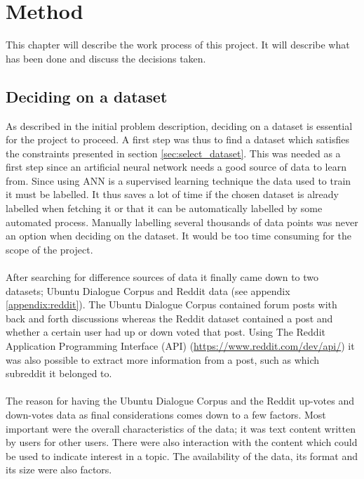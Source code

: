 \chapter{Method}\label{chap:method}
This chapter will describe the work process of this project. It will describe what has been done and discuss the decisions taken.

\section{Deciding on a dataset}\label{sec:deciding_dataset}
As described in the initial problem description, deciding on a dataset is essential for the project to proceed. A first step was thus to find a dataset which satisfies the constraints presented in section \ref{sec:select_dataset}. This was needed as a first step since an artificial neural network needs a good source of data to learn from. Since using ANN is a supervised learning technique the data used to train it must be labelled. It thus saves a lot of time if the chosen dataset is already labelled when fetching it or that it can be automatically labelled by some automated process. Manually labelling several thousands of data points was never an option when deciding on the dataset. It would be too time consuming for the scope of the project.
\\\\
After searching for difference sources of data it finally came down to two datasets; Ubuntu Dialogue Corpus \parencite{lowe2015ubuntu} and Reddit data (see appendix \ref{appendix:reddit}). The Ubuntu Dialogue Corpus contained forum posts with back and forth discussions whereas the Reddit dataset contained a post and whether a certain user had up or down voted that post. Using The Reddit Application Programming Interface (API) (\url{https://www.reddit.com/dev/api/}) it was also possible to extract more information from a post, such as which subreddit it belonged to.
\\\\
The reason for having the Ubuntu Dialogue Corpus and the Reddit up-votes and down-votes data as final considerations comes down to a few factors. Most important were the overall characteristics of the data; it was text content written by users for other users. There were also interaction with the content which could be used to indicate interest in a topic. The availability of the data, its format and its size were also factors.
\\\\
